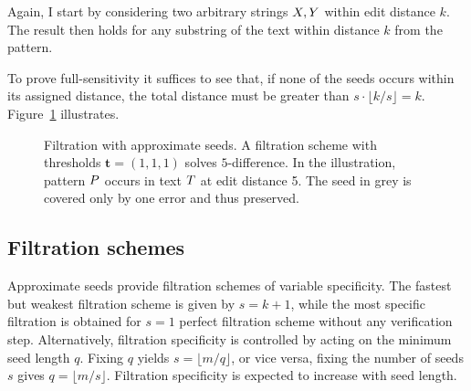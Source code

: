 Again, I start by considering two arbitrary strings $X,Y$ within edit distance $k$.
The result then holds for any substring of the text within distance $k$ from the pattern.
To prove full-sensitivity it suffices to see that, if none of the seeds occurs within its assigned distance, the total distance must be greater than $s \cdot \lfloor k/s \rfloor = k$.
Figure~\ref{fig:seeds-apx} illustrates.

\begin{figure}[t]
\begin{center}
\caption[Filtration with approximate seeds]{Filtration with approximate seeds. A filtration scheme with thresholds $\mathbf{t} = (1,1,1)$ solves $5$-difference. In the illustration, pattern $P$ occurs in text $T$ at edit distance 5. The seed in grey is covered only by one error and thus preserved.}
\label{fig:seeds-apx}

\end{center}
\end{figure}


\subsection{Filtration schemes}

Approximate seeds provide filtration schemes of variable specificity.
The fastest but weakest filtration scheme is given by $s=k+1$, while the most specific filtration is obtained for $s=1$ \ie perfect filtration scheme without any verification step.
Alternatively, filtration specificity is controlled by acting on the minimum seed length $q$.
Fixing $q$ yields $s = \lfloor m/q \rfloor$, or vice versa, fixing the number of seeds $s$ gives $q =\lfloor m/s \rfloor$.
Filtration specificity is expected to increase with seed length.

